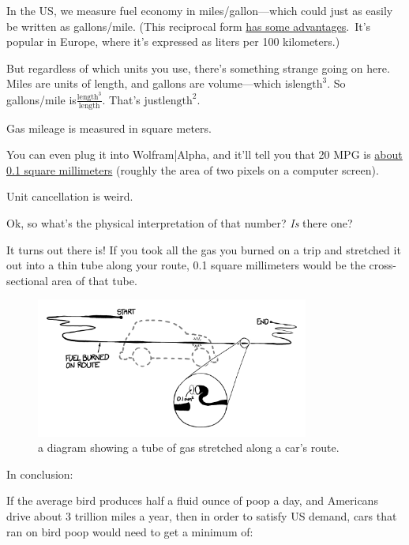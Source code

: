 {In the US, we measure fuel economy in miles/gallon—which could just as easily be written as gallons/mile. (This reciprocal form \href{http://wheels.blogs.nytimes.com/2008/06/20/the-illusion-of-miles-per-gallon/}{has some advantages}. It’s popular in Europe, where it’s expressed as liters per 100 kilometers.)}

{But regardless of which units you use, there’s something strange going on here. Miles are units of length, and gallons are volume—which is\(\text{length}^3\). So gallons/mile is\(\frac{\text{length}^3}{\text{length}}\). That’s just\(\text{length}^2\).}

{Gas mileage is measured in square meters.}

{You can even plug it into Wolfram|Alpha, and it’ll tell you that 20 MPG is \href{http://www.wolframalpha.com/input/?i=1\%2F\%2820+mile\%2Fgallon\%29+to+mm\%5E2}{about 0.1 square millimeters} (roughly the area of two pixels on a computer screen).}

{Unit cancellation is weird.}

{Ok, so what’s the physical interpretation of that number? \emph{Is} there one?}

{It turns out there is! If you took all the gas you burned on a trip and stretched it out into a thin tube along your route, 0.1 square millimeters would be the cross-sectional area of that tube.}

\begin{figure}[!htbp]
\centering
\includegraphics[scale=0.5, max width=0.8\textwidth]{imgs/a/11/droppings_car.png}
\caption{a diagram showing a tube of gas stretched along a car's route.}
\end{figure}

{In conclusion:}

{If the average bird produces half a fluid ounce of poop a day, and Americans drive about 3 trillion miles a year, then in order to satisfy US demand, cars that ran on bird poop would need to get a minimum of:}

